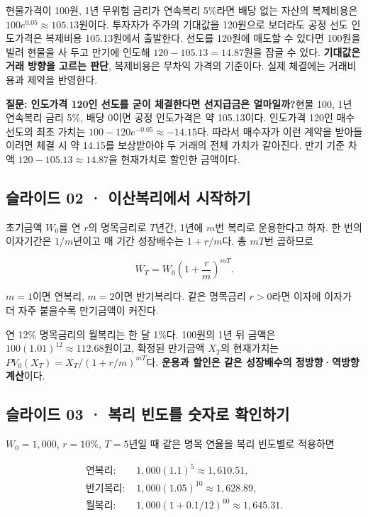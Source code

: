 \documentclass[11pt,a4paper]{article}
\begin{document}
현물가격이 100원, 1년 무위험 금리가 연속복리 5\%라면 배당 없는 자산의 복제비용은 $100e^{0.05}\approx105.13$원이다. 투자자가 주가의 기대값을 120원으로 보더라도 공정 선도 인도가격은 복제비용 105.13원에서 출발한다. 선도를 120원에 매도할 수 있다면 100원을 빌려 현물을 사 두고 만기에 인도해 $120-105.13=14.87$원을 잠글 수 있다. \textbf{기대값은 거래 방향을 고르는 판단}, 복제비용은 무차익 가격의 기준이다. 실제 체결에는 거래비용과 제약을 반영한다.\par

\par\medskip\noindent\textbf{질문: 인도가격 120인 선도를 굳이 체결한다면 선지급금은 얼마일까?}\quad 현물 100, 1년 연속복리 금리 5\%, 배당 0이면 공정 인도가격은 약 105.13이다. 인도가격 120인 매수 선도의 최초 가치는 $100-120e^{-0.05}\approx-14.15$다. 따라서 매수자가 이런 계약을 받아들이려면 체결 시 약 14.15를 보상받아야 두 거래의 전체 가치가 같아진다. 만기 기준 차액 $120-105.13\approx14.87$을 현재가치로 할인한 금액이다.\par

\subsection{슬라이드 02 · 이산복리에서 시작하기}
초기금액 $W_0$를 연 $r$의 명목금리로 $T$년간, 1년에 $m$번 복리로 운용한다고 하자. 한 번의 이자기간은 $1/m$년이고 매 기간 성장배수는 $1+r/m$다. 총 $mT$번 곱하므로\par

\[
W_T=W_0\left(1+\frac{r}{m}\right)^{mT}.
\]

$m=1$이면 연복리, $m=2$이면 반기복리다. 같은 명목금리 $r>0$라면 이자에 이자가 더 자주 붙을수록 만기금액이 커진다.\par

연 12\% 명목금리의 월복리는 한 달 1\%다. 100원의 1년 뒤 금액은 $100(1.01)^{12}\approx112.68$원이고, 확정된 만기금액 $X_T$의 현재가치는 $PV_0(X_T)=X_T/(1+r/m)^{mT}$다. \textbf{운용과 할인은 같은 성장배수의 정방향·역방향 계산}이다.\par

\subsection{슬라이드 03 · 복리 빈도를 숫자로 확인하기}
$W_0=1,000$, $r=10\%$, $T=5$년일 때 같은 명목 연율을 복리 빈도별로 적용하면\par

\[
\begin{aligned}
\text{연복리: }&1{,}000(1.1)^5\approx1{,}610.51,\\
\text{반기복리: }&1{,}000(1.05)^{10}\approx1{,}628.89,\\
\text{월복리: }&1{,}000(1+0.1/12)^{60}\approx1{,}645.31.
\end{aligned}
\]
\end{document}
